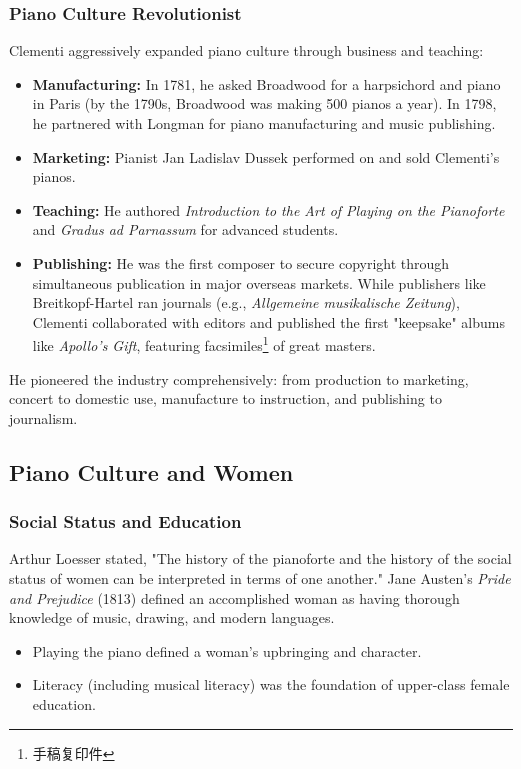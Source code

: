 \documentclass[math,code]{amznotes}
\theoremstyle{remark}
\begin{document}
\subsubsection{Piano Culture Revolutionist}
Clementi aggressively expanded piano culture through business and teaching:
\begin{itemize}
    \item \textbf{Manufacturing:} In 1781, he asked Broadwood for a harpsichord and piano in Paris (by the 1790s, Broadwood was making 500 pianos a year). In 1798, he partnered with Longman for piano manufacturing and music publishing. 
    \item \textbf{Marketing:} Pianist Jan Ladislav Dussek performed on and sold Clementi's pianos.
    \item \textbf{Teaching:} He authored \textit{Introduction to the Art of Playing on the Pianoforte} and \textit{Gradus ad Parnassum} for advanced students.
    \item \textbf{Publishing:} He was the first composer to secure copyright through simultaneous publication in major overseas markets. While publishers like Breitkopf-Hartel ran journals (e.g., \textit{Allgemeine musikalische Zeitung}), Clementi collaborated with editors and published the first "keepsake" albums like \textit{Apollo's Gift}, featuring facsimiles\footnote{手稿复印件} of great masters.
\end{itemize}
He pioneered the industry comprehensively: from production to marketing, concert to domestic use, manufacture to instruction, and publishing to journalism.

\subsection{Piano Culture and Women}
\subsubsection{Social Status and Education}
Arthur Loesser stated, "The history of the pianoforte and the history of the social status of women can be interpreted in terms of one another." Jane Austen's \textit{Pride and Prejudice} (1813) defined an accomplished woman as having thorough knowledge of music, drawing, and modern languages.
\begin{itemize}
    \item Playing the piano defined a woman's upbringing and character.
    \item Literacy (including musical literacy) was the foundation of upper-class female education.
\end{itemize}
\end{document}
